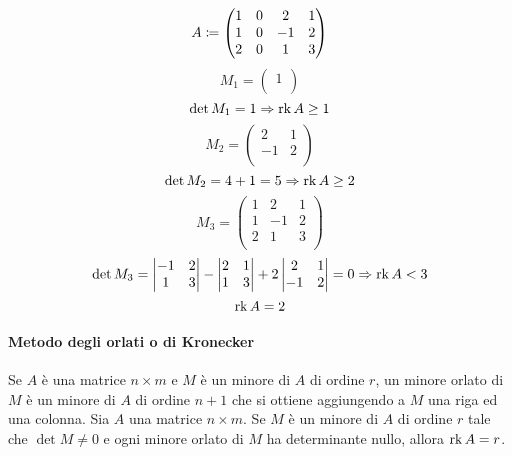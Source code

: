 \begin{example}
  $$
    A\coloneqq
    \begin{pmatrix}
      1 & 0 & 2  & 1 \\
      1 & 0 & -1 & 2 \\
      2 & 0 & 1  & 3 \\
    \end{pmatrix}
  $$
  $$
    M_1=
    \begin{pmatrix}
      1 \\
    \end{pmatrix}
  $$
  $$\det M_1=1\Rightarrow \operatorname{rk} A \ge 1$$
  $$
    M_2=
    \begin{pmatrix}
      2  & 1 \\
      -1 & 2 \\
    \end{pmatrix}
  $$
  $$\det M_2=4+1=5\Rightarrow \operatorname{rk} A \ge 2$$
  $$
    M_3=
    \begin{pmatrix}
      1 & 2  & 1 \\
      1 & -1 & 2 \\
      2 & 1  & 3 \\
    \end{pmatrix}
  $$
  $$
    \det M_3=
    \begin{vmatrix}
      -1 & 2 \\
      1  & 3 \\
    \end{vmatrix}
    -
    \begin{vmatrix}
      2 & 1 \\
      1 & 3 \\
    \end{vmatrix}
    +
    2\begin{vmatrix}
      2  & 1 \\
      -1 & 2 \\
    \end{vmatrix}
    =0
    \Rightarrow \operatorname{rk} A < 3
  $$
  $$\operatorname{rk} A=2$$
\end{example}

\paragraph*{Metodo degli orlati o di Kronecker}
Se $A$ è una matrice $n\times m$ e $M$ è un minore di $A$ di ordine $r$, un minore orlato di $M$ è un minore di $A$ di ordine $n+1$ che si ottiene aggiungendo a $M$ una riga ed una colonna.
Sia $A$ una matrice $n\times m$. Se $M$ è un minore di $A$ di ordine $r$ tale che $\det M\neq 0$ e ogni minore orlato di $M$ ha determinante nullo, allora $\operatorname{rk} A=r$.

